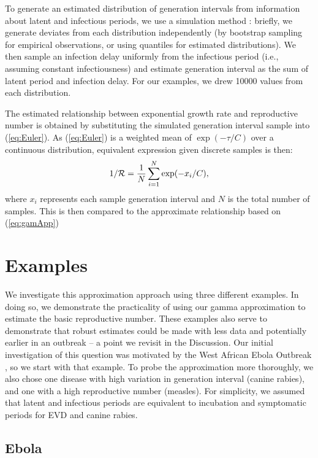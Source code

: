 \documentclass[12pt]{article}
\newcommand{\RR}{\ensuremath{{\cal R}}}
\newcommand{\eref}[1]{(\ref{eq:#1})}
\begin{document}
{To generate an estimated distribution of generation intervals from information about latent and infectious periods, we use a simulation method \cite{HampDush09}: briefly, we generate deviates from each distribution independently (by bootstrap sampling for empirical observations, or using quantiles for estimated distributions). 
We then sample an infection delay uniformly from the infectious period (i.e., assuming constant infectiousness) and estimate generation interval as the sum of latent period and infection delay.  
For our examples, we drew 10000 values from each distribution. 

The estimated relationship between exponential growth rate and reproductive number is obtained by substituting the simulated generation interval sample into \eref{Euler}.
As \eref{Euler} is a weighted mean of $\exp(-\tau/C)$ over a continuous distribution, equivalent expression given discrete samples is then:
\begin{equation}
1/\RR = \frac{1}{N} \sum_{i=1}^{N} \exp(-x_i/C),
\label{eq:obsR}
\end{equation}
where $x_i$ represents each sample generation interval and $N$ is the total number of samples. 
This is then compared to the approximate relationship based on \eref{gamApp}

\section{Examples}

We investigate this approximation approach using three different examples. 
In doing so, we demonstrate the practicality of using our gamma approximation to estimate the basic reproductive number. 
These examples also serve to demonstrate that robust estimates could be made with less data and potentially earlier in an outbreak -- a point we revisit in the Discussion.
Our initial investigation of this question was motivated by the West African Ebola Outbreak \cite{WeitDush15}, so we start with that example. To probe the approximation more thoroughly, we also chose one disease with high variation in generation interval (canine rabies), and one with a high reproductive number (measles). 
For simplicity, we assumed that latent and infectious periods are equivalent to incubation and symptomatic periods for EVD and canine rabies.

\subsection{Ebola}
\label{EbolaEx}

}
\end{document}
